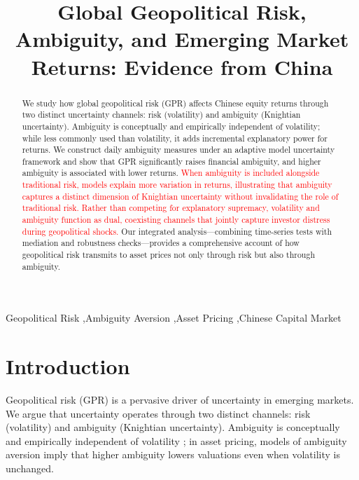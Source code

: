 \documentclass[preprint,12pt,authoryear]{elsarticle}
\begin{document}
\begin{frontmatter}

\title{Global Geopolitical Risk, Ambiguity, and Emerging Market Returns: Evidence from China}

\begin{abstract}
We study how global geopolitical risk (GPR) affects Chinese equity returns through two distinct uncertainty channels: risk (volatility) and ambiguity (Knightian uncertainty). Ambiguity is conceptually and empirically independent of volatility; while less commonly used than volatility, it adds incremental explanatory power for returns. We construct daily ambiguity measures under an adaptive model uncertainty framework and show that GPR significantly raises financial ambiguity, and higher ambiguity is associated with lower returns. \textcolor{red}{When ambiguity is included alongside traditional risk, models explain more variation in returns, illustrating that ambiguity captures a distinct dimension of Knightian uncertainty without invalidating the role of traditional risk. Rather than competing for explanatory supremacy, volatility and ambiguity function as dual, coexisting channels that jointly capture investor distress during geopolitical shocks.} Our integrated analysis—combining time-series tests with mediation and robustness checks—provides a comprehensive account of how geopolitical risk transmits to asset prices not only through risk but also through ambiguity.
\end{abstract}

\begin{keyword}
Geopolitical Risk \sep Ambiguity Aversion \sep Asset Pricing \sep Chinese Capital Market
\end{keyword}

\end{frontmatter}

\section{Introduction}

Geopolitical risk (GPR) is a pervasive driver of uncertainty in emerging markets. We argue that uncertainty operates through two distinct channels: risk (volatility) and ambiguity (Knightian uncertainty). Ambiguity is conceptually and empirically independent of volatility \citep{Knight1921, Ellsberg1961}; in asset pricing, models of ambiguity aversion \citep{Gilboa1989, Klibanoff2005} imply that higher ambiguity lowers valuations even when volatility is unchanged.
\end{document}
